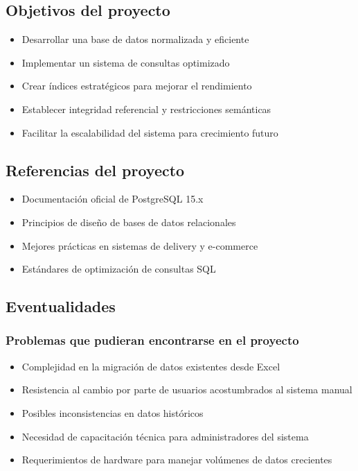 \documentclass[12pt,a4paper]{article}
\begin{document}
\subsection{Objetivos del proyecto}
\begin{itemize}
    \item Desarrollar una base de datos normalizada y eficiente
    \item Implementar un sistema de consultas optimizado
    \item Crear índices estratégicos para mejorar el rendimiento
    \item Establecer integridad referencial y restricciones semánticas
    \item Facilitar la escalabilidad del sistema para crecimiento futuro
\end{itemize}

\subsection{Referencias del proyecto}
\begin{itemize}
    \item Documentación oficial de PostgreSQL 15.x
    \item Principios de diseño de bases de datos relacionales
    \item Mejores prácticas en sistemas de delivery y e-commerce
    \item Estándares de optimización de consultas SQL
\end{itemize}

\subsection{Eventualidades}
\subsubsection{Problemas que pudieran encontrarse en el proyecto}
\begin{itemize}
    \item Complejidad en la migración de datos existentes desde Excel
    \item Resistencia al cambio por parte de usuarios acostumbrados al sistema manual
    \item Posibles inconsistencias en datos históricos
    \item Necesidad de capacitación técnica para administradores del sistema
    \item Requerimientos de hardware para manejar volúmenes de datos crecientes
\end{itemize}
\end{document}

